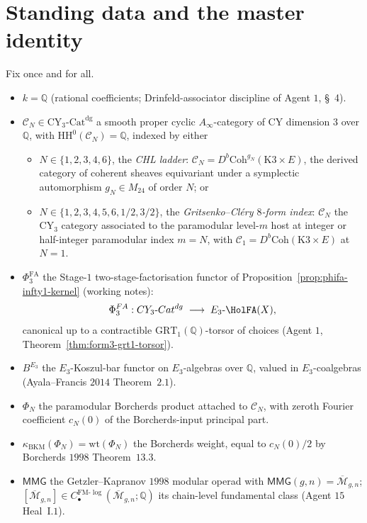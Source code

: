 \documentclass[11pt]{amsart}
\providecommand{\Q}{\mathbb{Q}}
\providecommand{\HH}{\mathrm{HH}}
\providecommand{\cC}{\mathcal{C}}
\providecommand{\GRT}{\mathrm{GRT}}
\providecommand{\PhiFA}{\Phi^{\mathrm{FA}}}
\providecommand{\Mbar}{\overline{\mathcal{M}}}
\providecommand{\Coh}{\mathrm{Coh}}
\providecommand{\FM}{\mathrm{FM}}
\providecommand{\kBKM}{\kappa_{\mathrm{BKM}}}
\begin{document}
\tableofcontents

\section{Standing data and the master identity}
\label{sec:master-standing-data}

Fix once and for all.
\begin{itemize}
\item $k = \Q$ (rational coefficients; Drinfeld-associator discipline of
Agent $1$, \S~4).
\item $\cC_N \in \mathrm{CY}_3\text{-}\mathrm{Cat}^{\mathrm{dg}}$ a
smooth proper cyclic $A_\infty$-category of CY dimension $3$ over
$\Q$, with $\HH^0(\cC_N) = \Q$, indexed by either
  \begin{itemize}
  \item[(A)] $N \in \{1, 2, 3, 4, 6\}$, the \emph{CHL ladder}:
  $\cC_N = D^b \Coh^{g_N}(\mathrm{K3} \times E)$, the derived
  category of coherent sheaves equivariant under a
  symplectic automorphism $g_N \in M_{24}$ of order $N$; or
  \item[(B)] $N \in \{1, 2, 3, 4, 5, 6, 1/2, 3/2\}$, the
  \emph{Gritsenko--Cl\'ery $8$-form index}: $\cC_N$ the CY$_3$
  category associated to the paramodular level-$m$ host at integer or
  half-integer paramodular index $m = N$, with
  $\cC_1 = D^b\Coh(\mathrm{K3} \times E)$ at $N = 1$.
  \end{itemize}
\item $\PhiFA_3$ the Stage-$1$ two-stage-factorisation functor of
Proposition~\ref{prop:phifa-infty1-kernel} (working notes):
\[
 \PhiFA_3 \colon
 \mathrm{CY}_3\text{-}\mathrm{Cat}^{\mathrm{dg}}
 \;\longrightarrow\;
 E_3\text{-}\HolFA(X),
\]
canonical up to a contractible $\GRT_1(\Q)$-torsor of choices
(Agent $1$, Theorem~\ref{thm:form3-grt1-torsor}).
\item $B^{E_3}$ the $E_3$-Koszul-bar functor on $E_3$-algebras over
$\Q$, valued in $E_3$-coalgebras (Ayala--Francis $2014$
Theorem~$2.1$).
\item $\Phi_N$ the paramodular Borcherds product attached to $\cC_N$,
with zeroth Fourier coefficient $c_N(0)$ of the Borcherds-input
principal part.
\item $\kBKM(\Phi_N) = \mathrm{wt}(\Phi_N)$ the Borcherds weight,
equal to $c_N(0)/2$ by Borcherds $1998$ Theorem~$13.3$.
\item $\mathsf{MMG}$ the Getzler--Kapranov $1998$ modular operad with
$\mathsf{MMG}(g, n) = \overline{\mathcal M}_{g, n}$; $[\Mbar_{g, n}]
\in C_\bullet^{\FM\text{-}\log}(\Mbar_{g, n}; \Q)$ its chain-level
fundamental class (Agent $15$ Heal~I.$1$).
\end{itemize}
\end{document}
